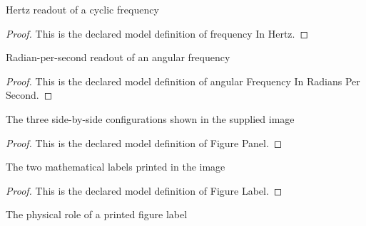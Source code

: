 \begin{definition}
  \label{def:physics:phyx-mini-0281:phyxminiproblems-problemphyxmini0281-frequencyinhertz}
  Hertz readout of a cyclic frequency
\end{definition}
\begin{proof}
  This is the declared model definition of frequency In Hertz.
\end{proof}
\begin{definition}
  \label{def:physics:phyx-mini-0281:phyxminiproblems-problemphyxmini0281-angularfrequencyinradianspersecond}
  Radian-per-second readout of an angular frequency
\end{definition}
\begin{proof}
  This is the declared model definition of angular Frequency In Radians Per Second.
\end{proof}
\begin{definition}
  \label{def:physics:phyx-mini-0281:phyxminiproblems-problemphyxmini0281-figurepanel}
  The three side-by-side configurations shown in the supplied image
\end{definition}
\begin{proof}
  This is the declared model definition of Figure Panel.
\end{proof}
\begin{definition}
  \label{def:physics:phyx-mini-0281:phyxminiproblems-problemphyxmini0281-figurelabel}
  The two mathematical labels printed in the image
\end{definition}
\begin{proof}
  This is the declared model definition of Figure Label.
\end{proof}
\begin{definition}
  \label{def:physics:phyx-mini-0281:phyxminiproblems-problemphyxmini0281-figurequantityrole}
  The physical role of a printed figure label
\end{definition}
